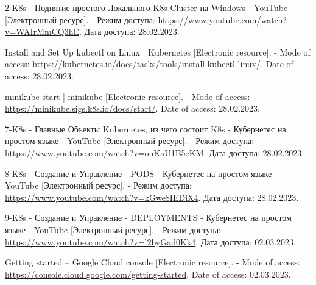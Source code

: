 \documentclass[12pt, a4paper, simple]{eskdtext}
\begin{document}
    \begin{thebibliography}{}

      2-K8s - Поднятие простого Локального K8s Cluster на Windows - YouTube
      [Электронный ресурс]. -
      Режим доступа:
      \url{https://www.youtube.com/watch?v=WAIrMmCQ3hE}.
      Дата доступа: 28.02.2023.

      Install and Set Up kubectl on Linux | Kubernetes
      [Electronic resource]. -
      Mode of access:
      \url{https://kubernetes.io/docs/tasks/tools/install-kubectl-linux/}.
      Date of access: 28.02.2023.

      minikube start | minikube
      [Electronic resource]. -
      Mode of access:
      \url{https://minikube.sigs.k8s.io/docs/start/}.
      Date of access: 28.02.2023.

      7-K8s - Главные Объекты Kubernetes, из чего состоит K8s - Кубернетес на простом языке - YouTube
      [Электронный ресурс]. -
      Режим доступа:
      \url{https://www.youtube.com/watch?v=ouKaU1B5eKM}.
      Дата доступа: 28.02.2023.

      8-K8s - Создание и Управление - PODS - Кубернетес на простом языке - YouTube
      [Электронный ресурс]. -
      Режим доступа:
      \url{https://www.youtube.com/watch?v=kGwe8IEDiX4}.
      Дата доступа: 28.02.2023.

      9-K8s - Создание и Управление - DEPLOYMENTS - Кубернетес на простом языке - YouTube
      [Электронный ресурс]. -
      Режим доступа:
      \url{https://www.youtube.com/watch?v=l2byGad0Kk4}.
      Дата доступа: 02.03.2023.

      Getting started – Google Cloud console
      [Electronic resource]. -
      Mode of access:
      \url{https://console.cloud.google.com/getting-started}.
      Date of access: 02.03.2023.

    \end{thebibliography}
  \endgroup
\end{document}
